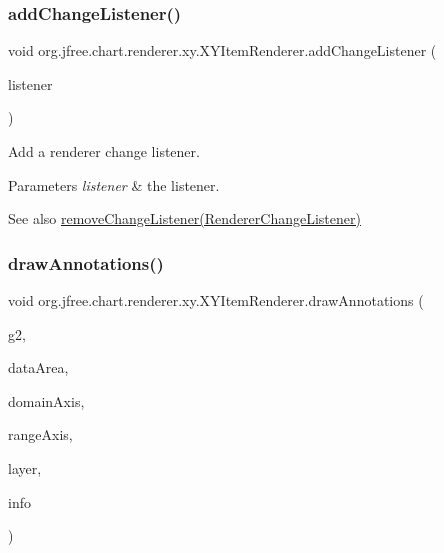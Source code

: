 \subsubsection{\texorpdfstring{add\+Change\+Listener()}{addChangeListener()}}
{\footnotesize\ttfamily void org.\+jfree.\+chart.\+renderer.\+xy.\+X\+Y\+Item\+Renderer.\+add\+Change\+Listener (\begin{DoxyParamCaption}\item[{\mbox{\hyperlink{interfaceorg_1_1jfree_1_1chart_1_1event_1_1_renderer_change_listener}{Renderer\+Change\+Listener}}}]{listener }\end{DoxyParamCaption})}

Add a renderer change listener.


\begin{DoxyParams}{Parameters}
{\em listener} & the listener.\\
\hline
\end{DoxyParams}
\begin{DoxySeeAlso}{See also}
\mbox{\hyperlink{interfaceorg_1_1jfree_1_1chart_1_1renderer_1_1xy_1_1_x_y_item_renderer_a1cbda675f267deb2d47b502d5683e869}{remove\+Change\+Listener(\+Renderer\+Change\+Listener)}} 
\end{DoxySeeAlso}
\mbox{\label{interfaceorg_1_1jfree_1_1chart_1_1renderer_1_1xy_1_1_x_y_item_renderer_ad211e137e4a6a549fdd7715a563aae7c}} 
\subsubsection{\texorpdfstring{draw\+Annotations()}{drawAnnotations()}}
{\footnotesize\ttfamily void org.\+jfree.\+chart.\+renderer.\+xy.\+X\+Y\+Item\+Renderer.\+draw\+Annotations (\begin{DoxyParamCaption}\item[{Graphics2D}]{g2,  }\item[{Rectangle2D}]{data\+Area,  }\item[{\mbox{\hyperlink{classorg_1_1jfree_1_1chart_1_1axis_1_1_value_axis}{Value\+Axis}}}]{domain\+Axis,  }\item[{\mbox{\hyperlink{classorg_1_1jfree_1_1chart_1_1axis_1_1_value_axis}{Value\+Axis}}}]{range\+Axis,  }\item[{Layer}]{layer,  }\item[{\mbox{\hyperlink{classorg_1_1jfree_1_1chart_1_1plot_1_1_plot_rendering_info}{Plot\+Rendering\+Info}}}]{info }\end{DoxyParamCaption})}

